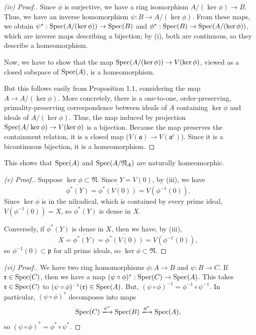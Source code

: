 \begin{proof}[(iv) Proof.]
Since $\phi$ is surjective, we have a ring isomorphism $A/(\ker \phi) \to B$. Thus, we have an inverse homomorphism 
$\psi : B \to A/(\ker \phi)$. From these maps, we obtain $\psi^* : \operatorname{Spec} (A/(\ker \phi)) \to \operatorname{Spec} (B)$ and 
$\phi^* : \operatorname{Spec}(B) \to \operatorname{Spec}(A/(\ker \phi))$, which are inverse maps describing a bijection; by (i), both are continuous, so they describe a homeomorphism.

Now, we have to show that the map $\operatorname{Spec}(A / (\ker \phi)) \to V(\ker \phi)$, viewed as a closed subspace of $\operatorname{Spec}(A)$, is a homeomorphism.

But this follows easily from Proposition 1.1, considering the map $A \to A/(\ker \phi)$. More concretely, 
there is a one-to-one, order-preserving, primality-preserving correspondence between ideals of $A$ containing $\ker \phi$
and ideals of $A/(\ker \phi)$. Thus, the map induced by projection $\operatorname{Spec}(A/\ker \phi) \to V(\ker\phi)$ is a bijection. 
Because the map preserves the containment relation, it is a closed map ($V(\mathfrak{a}) \to V(\mathfrak{a}^c)$). Since it is a bicontinuous bijection,
it is a homeomorphism.
\end{proof}

\begin{remark}
This shows that $\operatorname{Spec}(A)$ and $\operatorname{Spec}(A/\mathfrak{N}_A)$ are naturally homeomorphic.
\end{remark}

\begin{proof}[(v) Proof.]
Suppose $\ker \phi \subset \mathfrak{N}$. Since $Y = V(0)$, by (iii), we have 
$$\overline{\phi^*(Y)} = \overline{\phi^*(V(0))} = V(\phi^{-1}(0)).$$ Since $\ker \phi$ is in the nilradical, which is contained by every prime ideal,
$V(\phi^{-1}(0)) = X$, so $\phi^*(Y)$ is dense in $X$. 

Conversely, if $\phi^*(Y)$ is dense in $X$, then we have, by (iii),
$$X = \overline{\phi^*(Y)} = \overline{\phi^*(V(0))} = V(\phi^{-1}(0)),$$
so $\phi^{-1}(0) \subset \mathfrak{p}$ for all prime ideals, so $\ker \phi \subset \mathfrak{N}$.
\end{proof}

\begin{proof}[(vi) Proof.]
We have two ring homomorphisms $\phi : A \to B$ and $\psi : B \to C$. If $\mathfrak{r} \in \operatorname{Spec}(C)$, then we have a map $(\psi \circ \phi)^* : \operatorname{Spec}(C) \to \operatorname{Spec}(A)$. This takes
$\mathfrak{r} \in \operatorname{Spec}(C)$ to $(\psi \circ \phi)^{-1}(\mathfrak{r}) \in \operatorname{Spec}(A)$. But, $(\psi \circ \phi)^{-1} = \phi^{-1} \circ \psi^{-1}$. In particular,
$(\psi \circ \phi)^*$ decomposes into maps 
$$\Spec(C) \xlongrightarrow{\psi^*} \Spec(B) \xlongrightarrow{\phi^*} \Spec(A),$$ 
so $(\psi \circ \phi)^* = \phi^* \circ \psi^*$.
\end{proof}

